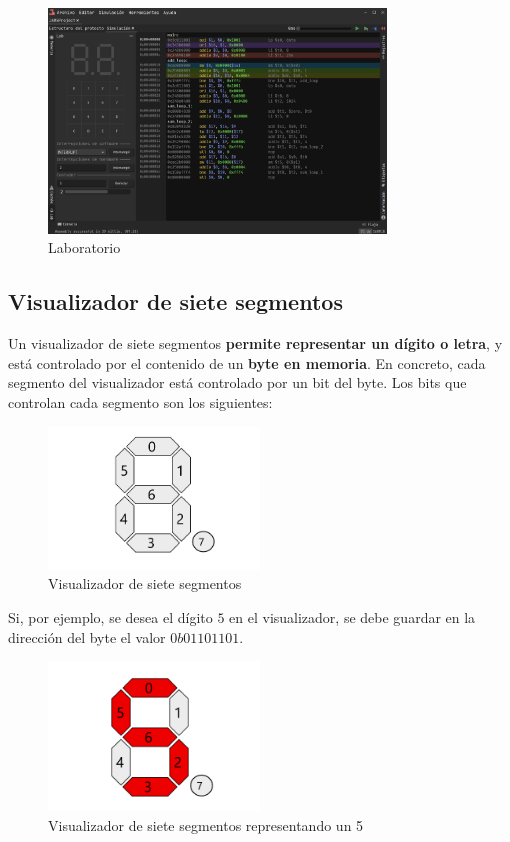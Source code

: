 \begin{figure}[H]
    \centering
    \includegraphics[width=0.8\textwidth]{images/tools/jams-lab}
    \caption{Laboratorio}
    \label{fig:jams-lab}
\end{figure}

\subsection{Visualizador de siete segmentos}\label{subsec:visualizador-de-siete-segmentos}

Un visualizador de siete segmentos \textbf{permite representar un dígito o letra},
y está controlado por el contenido de un \textbf{byte en memoria}.
En concreto, cada segmento del visualizador está controlado por un bit del byte.
Los bits que controlan cada segmento son los siguientes:

\begin{figure}[H]
    \centering
    \includegraphics[width=0.5\textwidth]{images/tools/jams-seven-segment}
    \caption{Visualizador de siete segmentos}
    \label{fig:jams-seven-segment}
\end{figure}

Si, por ejemplo, se desea el dígito $5$ en el visualizador,
se debe guardar en la dirección del byte el valor $0b01101101$.

\begin{figure}[H]
    \centering
    \includegraphics[width=0.5\textwidth]{images/tools/jams-seven-segment-active}
    \caption{Visualizador de siete segmentos representando un 5}
    \label{fig:jams-seven-segment-active}
\end{figure}

